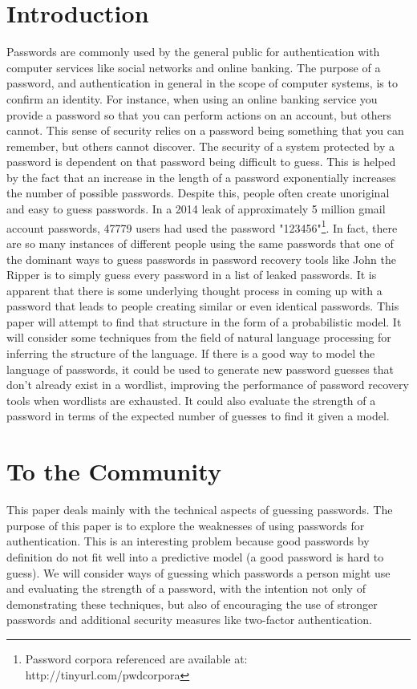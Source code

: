 \documentclass{amsart}
\theoremstyle{definition}
\theoremstyle{remark}
\numberwithin{equation}{section}
\begin{document}
\section{Introduction}
Passwords are commonly used by the general public for authentication with computer services like social networks and online banking. The purpose of a password, and authentication in general in the scope of computer systems, is to confirm an identity. For instance, when using an online banking service you provide a password so that you can perform actions on an account, but others cannot. This sense of security relies on a password being something that you can remember, but others cannot discover. The security of a system protected by a password is dependent on that password being difficult to guess. This is helped by the fact that an increase in the length of a password exponentially increases the number of possible passwords. Despite this, people often create unoriginal and easy to guess passwords. In a 2014 leak of approximately 5 million gmail account passwords, 47779 users had used the password "123456"\footnote{Password corpora referenced are available at: http://tinyurl.com/pwdcorpora}. In fact, there are so many instances of different people using the same passwords that one of the dominant ways to guess passwords in password recovery tools like John the Ripper is to simply guess every password in a list of leaked passwords. It is apparent that there is some underlying thought process in coming up with a password that leads to people creating similar or even identical passwords. This paper will attempt to find that structure in the form of a probabilistic model. It will consider some techniques from the field of natural language processing for inferring the structure of the language. If there is a good way to model the language of passwords, it could be used to generate new password guesses that don't already exist in a wordlist, improving the performance of password recovery tools when wordlists are exhausted. It could also evaluate the strength of a password in terms of the expected number of guesses to find it given a model.

\section{To the Community}
This paper deals mainly with the technical aspects of guessing passwords. The purpose of this paper is to explore the weaknesses of using passwords for authentication. This is an interesting problem because good passwords by definition do not fit well into a predictive model (a good password is hard to guess). We will consider ways of guessing which passwords a person might use and evaluating the strength of a password, with the intention not only of demonstrating these techniques, but also of encouraging the use of stronger passwords and additional security measures like two-factor authentication.
\end{document}
